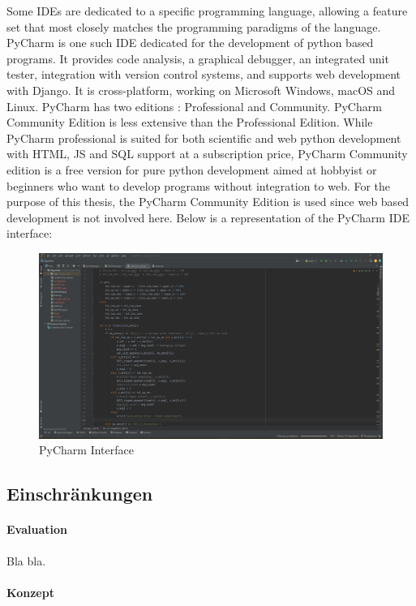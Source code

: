 Some IDEs are dedicated to a specific programming language, allowing a feature set that most closely matches the programming paradigms of the language.\cite{PyWiki} PyCharm is one such IDE dedicated for the development of python based programs. It provides code analysis, a graphical debugger, an integrated unit tester, integration with version control systems, and supports web development with Django. It is cross-platform, working on Microsoft Windows, macOS and Linux. PyCharm has two editions : Professional and Community. PyCharm Community Edition is less extensive than the Professional Edition. While PyCharm professional is suited for both scientific and web python development with HTML, JS and SQL support at a subscription price, PyCharm Community edition is a free version for pure python development aimed at hobbyist or beginners who want to develop programs without integration to web. For the purpose of this thesis, the PyCharm Community Edition is used since web based development is not involved here. Below is a representation of the PyCharm IDE interface:

\begin{figure}[h]
    	\centering
    	\includegraphics[width= 1\textwidth]{images/pycharm.png}
    	\caption [PyCharm]{PyCharm Interface}  
    	\label{fig:Pycharm interface}
\end{figure}



\newpage
    
\subsection{Einschränkungen}


\paragraph{Evaluation} 
Bla bla.

\paragraph{Konzept}


